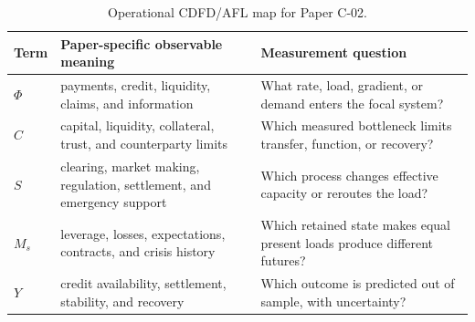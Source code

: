 \documentclass[11pt,a4paper]{article}
\begin{document}
\begin{table}[htbp]
\centering
\small
\caption{Operational CDFD/AFL map for Paper C-02.}
\begin{tabularx}{\textwidth}{|l|X|X|}
\hline
\textbf{Term} & \textbf{Paper-specific observable meaning} & \textbf{Measurement question} \\
\hline
$\Phi$ & payments, credit, liquidity, claims, and information & What rate, load, gradient, or demand enters the focal system? \\
\hline
$C$ & capital, liquidity, collateral, trust, and counterparty limits & Which measured bottleneck limits transfer, function, or recovery? \\
\hline
$S$ & clearing, market making, regulation, settlement, and emergency support & Which process changes effective capacity or reroutes the load? \\
\hline
$M_s$ & leverage, losses, expectations, contracts, and crisis history & Which retained state makes equal present loads produce different futures? \\
\hline
$Y$ & credit availability, settlement, stability, and recovery & Which outcome is predicted out of sample, with uncertainty? \\
\hline
\end{tabularx}
\end{table}
\end{document}
